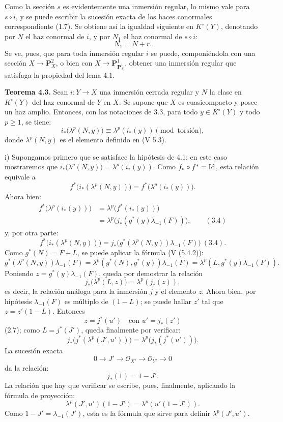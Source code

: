 Como la sección \(s\) es evidentemente una inmersión regular, lo mismo vale para \(s\circ i\), y se puede escribir la sucesión exacta de los haces conormales correspondiente (1.7). Se obtiene así la igualdad siguiente en \(K^\circ(Y)\), denotando por \(N\) el haz conormal de \(i\), y por \(N_1\) el haz conormal de \(s\circ i\):
\[
  N_1=N+r.
\]
Se ve, pues, que para toda inmersión regular \(i\) se puede, componiéndola con una sección \(X\to\mathbf P_X^2\), o bien con \(X\to\mathbf P_{\mathbf P_X^1}^{1}\), obtener una inmersión regular que satisfaga la propiedad del lema 4.1.

\textbf{Teorema 4.3.} Sean \(i:Y\to X\) una inmersión cerrada regular y \(N\) la clase en \(K^\circ(Y)\) del haz conormal de \(Y\) en \(X\). Se supone que \(X\) es cuasicompacto y posee un haz amplio. Entonces, con las notaciones de 3.3, para todo \(y\in K^\circ(Y)\) y todo \(p\ge1\), se tiene:
\begin{equation}\tag{4.3.1}
 i_*\bigl(\lambda^p(N,y)\bigr)\equiv \lambda^p(i_*(y))
 \pmod{\text{torsión}},
\end{equation}
donde \(\lambda^p(N,y)\) es el elemento definido en (V 5.3).

i) Supongamos primero que se satisface la hipótesis de 4.1; en este caso mostraremos que \(i_*\bigl(\lambda^p(N,y)\bigr)=\lambda^p(i_*(y))\). Como \(f_*\circ f^*=\operatorname{Id}\), esta relación equivale a
\[
  f^*\bigl(i_*(\lambda^p(N,y))\bigr)=
  f^*\bigl(\lambda^p(i_*(y))\bigr).
\]
Ahora bien:
\[
\begin{aligned}
 f^*\bigl(\lambda^p(i_*(y))\bigr)
 &=\lambda^p\bigl(f^*(i_*(y))\bigr)\\
 &=\lambda^p\bigl(j_*(g^*(y)\lambda_{-1}(F))\bigr),
\qquad(3.4)
\end{aligned}
\]
y, por otra parte:
\[
  f^*\bigl(i_*(\lambda^p(N,y))\bigr)
  =
  j_*\bigl(g^*(\lambda^p(N,y))\lambda_{-1}(F)\bigr)\ (3.4).
\]
Como \(g^*(N)=F+L\), se puede aplicar la fórmula (V (5.4.2)):
\[
  g^*(\lambda^p(N,y))\lambda_{-1}(F)
  =
  \lambda^p(g^*(N),g^*(y))\lambda_{-1}(F)
  =
  \lambda^p(L,g^*(y)\lambda_{-1}(F)).
\]
Poniendo \(z=g^*(y)\lambda_{-1}(F)\), queda por demostrar la relación
\[
  j_*\bigl(\lambda^p(L,z)\bigr)=\lambda^p(j_*(z)),
\]
es decir, la relación análoga para la inmersión \(j\) y el elemento \(z\). Ahora bien, por hipótesis \(\lambda_{-1}(F)\) es múltiplo de \((1-L)\); se puede hallar \(z'\) tal que \(z=z'(1-L)\). Entonces
\[
  z=j^*(u')\quad\text{con }u'=j_*(z')
\]
(2.7); como \(L=j^*(J')\), queda finalmente por verificar:
\[
  j_*\bigl(j^*(\lambda^p(J',u'))\bigr)=
  \lambda^p\bigl(j_*(j^*(u'))\bigr).
\]
La sucesión exacta
\[
  0\longrightarrow J'\longrightarrow \mathcal O_{X'}
  \longrightarrow \mathcal O_{Y'}\longrightarrow 0
\]
da la relación:
\begin{equation}\tag{4.3.2}
  j_*(1)=1-J'.
\end{equation}
La relación que hay que verificar se escribe, pues, finalmente, aplicando la fórmula de proyección:
\[
  \lambda^p(J',u')(1-J')=\lambda^p(u'(1-J')).
\]
Como \(1-J'=\lambda_{-1}(J')\), esta es la fórmula que sirve para definir \(\lambda^p(J',u')\).

